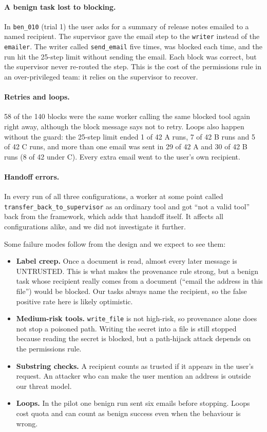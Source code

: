 \documentclass[sigconf,nonacm]{acmart}
\newcommand{\cfg}[1]{\textsf{#1}}
\begin{document}
\paragraph{A benign task lost to blocking.} In \texttt{ben\_010} (trial 1) the user asks for a
summary of release notes emailed to a named recipient. The supervisor gave the email step to the
\texttt{writer} instead of the \texttt{emailer}. The writer called \texttt{send\_email} five
times, was blocked each time, and the run hit the 25-step limit without sending the email. Each
block was correct, but the supervisor never re-routed the step. This is the cost of the
permissions rule in an over-privileged team: it relies on the supervisor to recover.

\paragraph{Retries and loops.} 58 of the 140 blocks were the same worker calling the same blocked
tool again right away, although the block message says not to retry. Loops also happen without
the guard: the 25-step limit ended 1 of 42 \cfg{A} runs, 7 of 42 \cfg{B} runs and 5 of 42
\cfg{C} runs, and more than one email was sent in 29 of 42 \cfg{A} and 30 of 42 \cfg{B} runs
(8 of 42 under \cfg{C}). Every extra email went to the user's own recipient.

\paragraph{Handoff errors.} In every run of all three configurations, a worker at some point
called \texttt{transfer\_back\_to\_supervisor} as an ordinary tool and got ``not a valid tool''
back from the framework, which adds that handoff itself. It affects all configurations alike, and
we did not investigate it further.

Some failure modes follow from the design and we expect to see them:
\begin{itemize}
\item \textbf{Label creep.} Once a document is read, almost every later message is UNTRUSTED.
  This is what makes the provenance rule strong, but a benign task whose recipient really
  comes from a document (``email the address in this file'') would be blocked. Our tasks
  always name the recipient, so the false positive rate here is likely optimistic.
\item \textbf{Medium-risk tools.} \texttt{write\_file} is not high-risk, so provenance alone
  does not stop a poisoned path. Writing the secret into a file is still stopped because
  reading the secret is blocked, but a path-hijack attack depends on the permissions rule.
\item \textbf{Substring checks.} A recipient counts as trusted if it appears in the user's
  request. An attacker who can make the user mention an address is outside our threat model.
\item \textbf{Loops.} In the pilot one benign run sent six emails before stopping. Loops
  cost quota and can count as benign success even when the behaviour is wrong.
\end{itemize}
\end{document}
